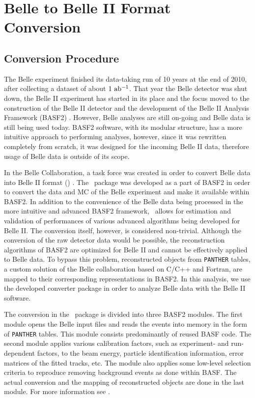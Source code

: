 \chapter{Belle to Belle II Format Conversion}

\section{Conversion Procedure}
The Belle experiment finished its data-taking run of 10 years at the end of 2010, after collecting a dataset of about $1\mathrm{~ab^{-1}}$. That year the Belle detector was shut down, the Belle II experiment has started in its place and the focus moved to the construction of the Belle II detector and the development of the Belle II Analysis Framework (BASF2) \cite{Kuhr:2018lps}. However, Belle analyses are still on-going and Belle data is still being used today. BASF2 software, with its modular structure, has a more intuitive approach to performing analyses, however, since it was rewritten completely from scratch, it was designed for the incoming Belle II data, therefore usage of Belle data is outside of its scope.

In the Belle Collaboration, a task force was created in order to convert Belle data into Belle II format (\btbii) \cite{Keck:b2bii2018}. The \btbii~package was developed as a part of BASF2 in order to convert the data and MC of the Belle experiment and make it available within BASF2. In addition to the convenience of the Belle data being processed in the more intuitive and advanced BASF2 framework, \btbii~allows for estimation and validation of performances of various advanced algorithms being developed for Belle II. The conversion itself, however, is considered non-trivial. Although the conversion of the raw detector data would be possible, the reconstruction algorithms of BASF2 are optimized for Belle II and cannot be effectively applied to Belle data. To bypass this problem, reconstructed objects from \texttt{PANTHER} tables, a custom solution of the Belle collaboration based on C/C++ and Fortran, are mapped to their corresponding representations in BASF2. In this analysis, we use the developed converter package in order to analyze Belle data with the Belle II software.

The conversion in the \btbii~package is divided into three BASF2 modules. The first module opens the Belle input files and reads the events into memory in the form of \texttt{PANTHER} tables. This module consists predominantly of reused BASF code. The second module applies various calibration factors, such as experiment- and run-dependent factors, to the beam energy, particle identification information, error matrices of the fitted tracks, etc. The module also applies some low-level selection criteria to reproduce removing background events as done within BASF. The actual conversion and the mapping of reconstructed objects are done in the last module. For more information see \cite{Keck:48940}.

